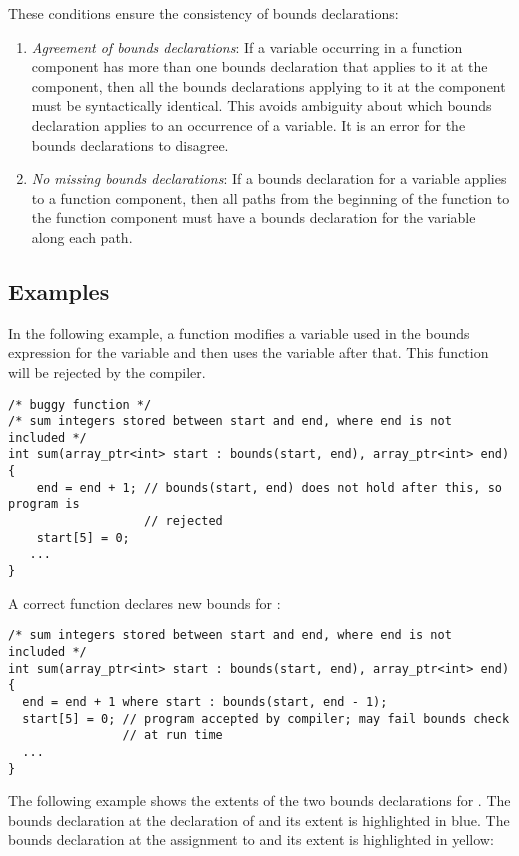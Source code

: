 These conditions ensure the consistency of bounds declarations:

\begin{enumerate}
\item
  \emph{Agreement of bounds declarations}: If a variable occurring in a
  function component has more than one bounds declaration that applies
  to it at the component, then all the bounds declarations applying to
  it at the component must be syntactically identical. This avoids
  ambiguity about which bounds declaration applies to an occurrence of a
  variable. It is an error for the bounds declarations to disagree.
\item
  \emph{No missing bounds declarations}: If a bounds declaration for a
  variable applies to a function component, then all paths from the
  beginning of the function to the function component must have a bounds
  declaration for the variable along each path.
\end{enumerate}

\subsection{Examples}
\label{examples:consistency}

In the following example, a function modifies a variable 
used in the bounds expression for the variable  and then
uses the variable  after that. This function will be
rejected by the compiler.

\begin{lstlisting}
/* buggy function */
/* sum integers stored between start and end, where end is not included */
int sum(array_ptr<int> start : bounds(start, end), array_ptr<int> end)
{
    end = end + 1; // bounds(start, end) does not hold after this, so program is
                   // rejected
    start[5] = 0;
   ...
}
\end{lstlisting}

A correct function declares new bounds for :

\begin{lstlisting}
/* sum integers stored between start and end, where end is not included */
int sum(array_ptr<int> start : bounds(start, end), array_ptr<int> end)
{
  end = end + 1 where start : bounds(start, end - 1);
  start[5] = 0; // program accepted by compiler; may fail bounds check
                // at run time
  ...
}
\end{lstlisting}

The following example shows the extents of the two bounds declarations for
.  The bounds declaration at the declaration of  and
its extent is highlighted in blue. The bounds declaration at the assignment
to  and its extent is highlighted in yellow:

